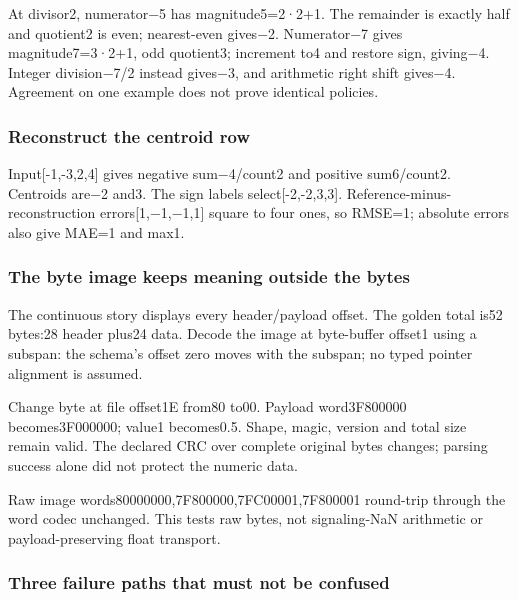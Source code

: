 \hypertarget{appendix-92ff77d4dfdc-fixed-negative-rounding-trace}{}

At divisor2, numerator−5 has magnitude5=2·2+1. The remainder is exactly half and quotient2 is even; nearest-even gives−2. Numerator−7 gives magnitude7=3·2+1, odd quotient3; increment to4 and restore sign, giving−4. Integer division−7/2 instead gives−3, and arithmetic right shift gives−4. Agreement on one example does not prove identical policies.

\subsubsection{Reconstruct the centroid row}\label{appendix-92ff77d4dfdc-reconstruct-the-centroid-row}

\hypertarget{appendix-92ff77d4dfdc-reconstruct-the-centroid-row}{}

Input{[}-1,-3,2,4{]} gives negative sum−4/count2 and positive sum6/count2. Centroids are−2 and3. The sign labels select{[}-2,-2,3,3{]}. Reference-minus-reconstruction errors{[}1,−1,−1,1{]} square to four ones, so RMSE=1; absolute errors also give MAE=1 and max1.

\subsubsection{The byte image keeps meaning outside the bytes}\label{appendix-92ff77d4dfdc-the-byte-image-keeps-meaning-outside-the-bytes}

\hypertarget{appendix-92ff77d4dfdc-the-byte-image-keeps-meaning-outside-the-bytes}{}

The continuous story displays every header/payload offset. The golden total is52 bytes:28 header plus24 data. Decode the image at byte-buffer offset1 using a subspan: the schema's offset zero moves with the subspan; no typed pointer alignment is assumed.

Change byte at file offset1E from80 to00. Payload word3F800000 becomes3F000000; value1 becomes0.5. Shape, magic, version and total size remain valid. The declared CRC over complete original bytes changes; parsing success alone did not protect the numeric data.

Raw image words80000000,7F800000,7FC00001,7F800001 round-trip through the word codec unchanged. This tests raw bytes, not signaling-NaN arithmetic or payload-preserving float transport.

\subsubsection{Three failure paths that must not be confused}\label{appendix-92ff77d4dfdc-three-failure-paths-that-must-not-be-confused}


